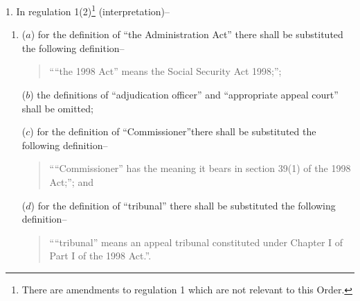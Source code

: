 \documentclass[12pt,a4paper]{article}
\begin{document}
1.  In regulation 1(2)\footnote{\frenchspacing There are amendments to regulation 1 which are not relevant to this Order.} (interpretation)–
\begin{enumerate}\item[]
($a$) for the definition of “the Administration Act” there shall be substituted the following definition–
\begin{quotation}
““the 1998 Act” means the Social Security Act 1998;”;
\end{quotation}

($b$) the definitions of “adjudication officer” and “appropriate appeal court” shall be omitted;

($c$) for the definition of “Commissioner”there shall be substituted the following definition–
\begin{quotation}
    ““Commissioner” has the meaning it bears in section 39(1) of the 1998 Act;”; and 
\end{quotation}

($d$) for the definition of “tribunal” there shall be substituted the following definition–
\begin{quotation}
““tribunal” means an appeal tribunal constituted under Chapter I of Part I of the 1998 Act.”.
\end{quotation}
\end{enumerate}

\medskip
\end{document}
